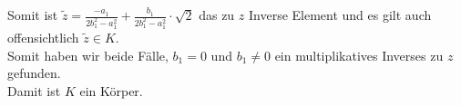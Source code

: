 %
\begin{frame}
Somit ist $\tilde z=\frac{-a_1}{2b_1^2-a_1^2} + \frac{b_1}{2b_1^2-a_1^2} \cdot \sqrt{2}$ das zu $z$ Inverse Element und es gilt auch offensichtlich $\tilde z \in K$. \\
\vfill
Somit haben wir beide Fälle, $b_1=0$ und $b_1\ne 0$ ein multiplikatives Inverses zu $z$ gefunden.\\
\vfill
Damit ist $K$ ein Körper.
\end{frame}
%
%


